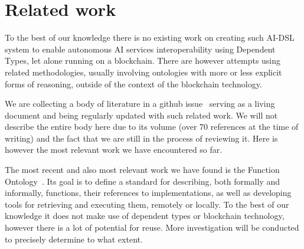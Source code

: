 \documentclass[]{report}
\begin{document}
\section{Related work}
\label{sec:related_work}
To the best of our knowledge there is no existing work on creating
such AI-DSL system to enable autonomous AI services interoperability
using Dependent Types, let alone running on a blockchain.  There are
however attempts using related methodologies, usually involving
ontologies with more or less explicit forms of reasoning, outside of
the context of the blockchain technology.

We are collecting a body of literature in a github
issue~\cite{AIDSLRelatedWork} serving as a living document and being
regularly updated with such related work.  We will not describe the
entire body here due to its volume (over 70 references at the time of
writing) and the fact that we are still in the process of reviewing
it.  Here is however the most relevant work we have encountered so
far.

The most recent and also most relevant work we have found is the
Function Ontology~\cite{FunctionOntology, DeMeester2020}. Its goal is
to define a standard for describing, both formally and informally,
functions, their references to implementations, as well as developing
tools for retrieving and executing them, remotely or locally.  To the
best of our knowledge it does not make use of dependent types or
blockchain technology, however there is a lot of potential for reuse.
More investigation will be conducted to precisely determine to what
extent.
\end{document}
